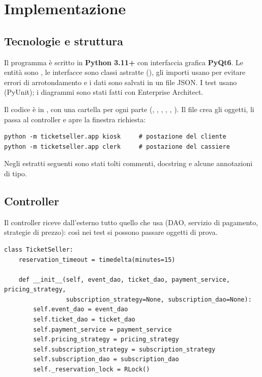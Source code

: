 \section{Implementazione}
\label{sec:implementazione}

\subsection{Tecnologie e struttura}

Il programma è scritto in \textbf{Python 3.11+} con interfaccia grafica \textbf{PyQt6}. Le entità sono , le interfacce sono classi astratte (), gli importi usano  per evitare errori di arrotondamento e i dati sono salvati in un file JSON. I test usano  (PyUnit); i diagrammi sono stati fatti con Enterprise Architect.

Il codice è in , con una cartella per ogni parte (, , , , , ). Il file  crea gli oggetti, li passa al controller e apre la finestra richiesta:

\par\noindent\begin{minipage}{\linewidth}
\begin{lstlisting}
python -m ticketseller.app kiosk     # postazione del cliente
python -m ticketseller.app clerk     # postazione del cassiere
\end{lstlisting}
\end{minipage}\par

Negli estratti seguenti sono stati tolti commenti, docstring e alcune annotazioni di tipo.

\subsection{Controller}

Il controller riceve dall'esterno tutto quello che usa (DAO, servizio di pagamento, strategie di prezzo): così nei test si possono passare oggetti di prova.

\par\noindent\begin{minipage}{\linewidth}
\begin{lstlisting}
class TicketSeller:
    reservation_timeout = timedelta(minutes=15)

    def __init__(self, event_dao, ticket_dao, payment_service, pricing_strategy,
                 subscription_strategy=None, subscription_dao=None):
        self.event_dao = event_dao
        self.ticket_dao = ticket_dao
        self.payment_service = payment_service
        self.pricing_strategy = pricing_strategy
        self.subscription_strategy = subscription_strategy
        self.subscription_dao = subscription_dao
        self._reservation_lock = RLock()
\end{lstlisting}
\end{minipage}\par

